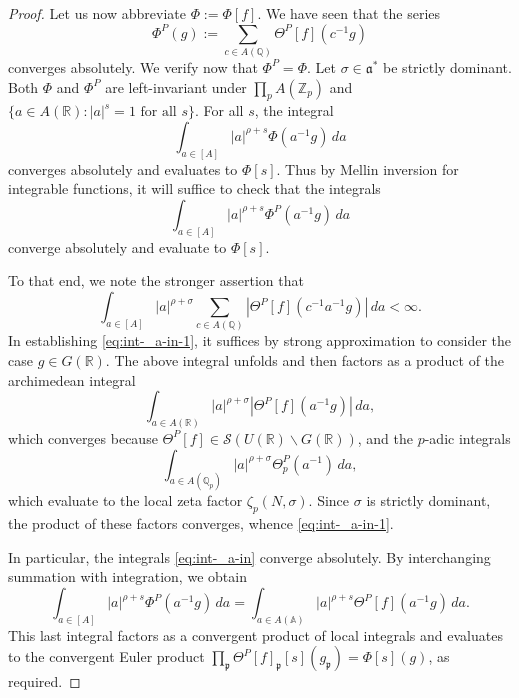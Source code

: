 \documentclass[reqno]{amsart}
\theoremstyle{plain} \newtheorem{theorem} {Theorem}
\theoremstyle{definition} \newtheorem{definition} [theorem] {Definition}
\theoremstyle{itplain} %
\numberwithin{equation}{section}
\numberwithin{theorem}{section}
\begin{document}
\begin{proof}
  Let us now abbreviate $\Phi := \Phi[f]$.  We have seen that the series
  \begin{equation*}
    \Phi ^P(g) := \sum _{c \in A(\mathbb{Q})} \Theta^P[f](c ^{-1} g)
  \end{equation*}
  converges absolutely.  We verify now that $\Phi^P = \Phi$.  Let $\sigma \in \mathfrak{a}^*$ be strictly dominant.  Both $\Phi$ and $\Phi ^P$ are left-invariant under $\prod_p A(\mathbb{Z}_p)$ and $\{a \in A(\mathbb{R}) : |a|^s = 1 \text{ for all } s \}$.  For all $s$, the integral
  \begin{equation*}
    \int _{a \in [A]} |a|^{\rho + s} \Phi(a^{-1} g) \, d a
  \end{equation*}
  converges absolutely and evaluates to $\Phi[s]$.  Thus by Mellin inversion for integrable functions, it will suffice to check that the integrals
  \begin{equation}\label{eq:int-_a-in}
    \int _{a \in [A]} |a|^{\rho + s} \Phi ^P (a ^{-1} g) \, d a
  \end{equation}
  converge absolutely and evaluate to $\Phi[s]$.

  To that end, we note the stronger assertion that
  \begin{equation}\label{eq:int-_a-in-1}
    \int _{a \in [A]} |a|^{\rho + \sigma} \sum_{c \in A(\mathbb{Q})}
    \left\lvert
      \Theta^P[f](c^{-1} a^{-1} g)
    \right\rvert
    \, d a < \infty.
  \end{equation}
  In establishing \eqref{eq:int-_a-in-1}, it suffices by strong approximation to consider the case $g \in G(\mathbb{R})$.  The above integral unfolds and then factors as a product of the archimedean integral
  \begin{equation*}
    \int _{a \in A(\mathbb{R})} |a|^{\rho + \sigma} 
    \left\lvert
      \Theta^P[f](a^{-1} g)
    \right\rvert
    \, d a,
  \end{equation*}
  which converges because $\Theta^P[f] \in \mathcal{S}(U(\mathbb{R}) \backslash G(\mathbb{R}))$, and the $p$-adic integrals
  \begin{equation*}
    \int _{a \in A(\mathbb{Q}_p)} |a|^{\rho + \sigma}
    \Theta_p^P(a^{-1})
    \, d a,
  \end{equation*}
  which evaluate to the local zeta factor $\zeta_p(N,\sigma)$.  Since $\sigma$ is strictly dominant, the product of these factors converges, whence \eqref{eq:int-_a-in-1}.
  
  In particular, the integrals \eqref{eq:int-_a-in} converge absolutely.  By interchanging summation with integration, we obtain
  \begin{equation*}
    \int _{a \in [A]} |a|^{\rho + s}
    \Phi ^P (a^{-1} g) \, d a
    =
    \int _{a \in A(\mathbb{A})}
    |a|^{\rho + s}
    \Theta^P[f] (a ^{-1} g) \, d a.
  \end{equation*}
  This last integral factors as a convergent product of local integrals and evaluates to the convergent Euler product $\prod_{\mathfrak{p}} \Theta^P[f]_\mathfrak{p}[s](g_\mathfrak{p}) = \Phi[s](g)$, as required.


\end{proof}
\end{document}
